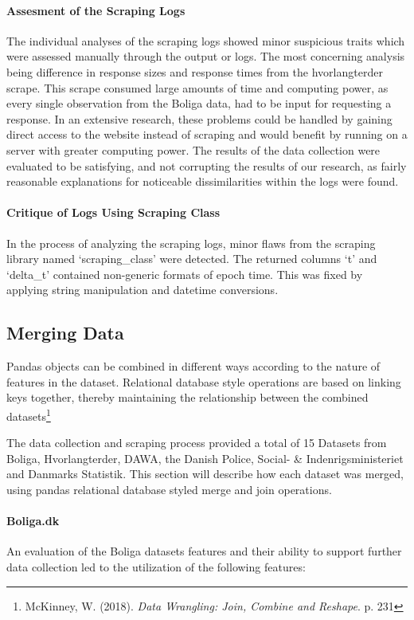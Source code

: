 \documentclass[12pt,a4paper]{article}
\begin{document}
\paragraph{Assesment of the Scraping Logs}
The individual analyses of the scraping logs showed minor suspicious traits which were assessed manually through the output or logs. The most concerning analysis being difference in response sizes and response times from the hvorlangterder scrape. This scrape consumed large amounts of time and computing power, as every single observation from the Boliga data, had to be input for requesting a response. In an extensive research, these problems could be handled by gaining direct access to the website instead of scraping and would benefit by running on a server with greater computing power. The results of the data collection were evaluated to be satisfying, and not corrupting the results of our research, as fairly reasonable explanations for noticeable dissimilarities within the logs were found. 

\paragraph{Critique of Logs Using Scraping Class}
In the process of analyzing the scraping logs, minor flaws from the scraping library named ‘scraping\_class’ were detected. The returned columns ‘t’ and ‘delta\_t’ contained non-generic formats of epoch time. This was fixed by applying string manipulation and datetime conversions. 

\subsection{Merging Data}
Pandas objects can be combined in different ways according to the nature of features in the dataset. Relational database style operations are based on linking keys together, thereby maintaining the relationship between the combined datasets\footnote{McKinney, W. (2018). \textit{Data Wrangling: Join, Combine and Reshape}. p. 231 }

The data collection and scraping process provided a total of 15 Datasets from Boliga, Hvorlangterder, DAWA, the Danish Police, Social- \& Indenrigsministeriet and Danmarks Statistik. This section will describe how each dataset was merged, using pandas relational database styled merge and join operations. 

\paragraph{Boliga.dk\newline}
An evaluation of the Boliga datasets features and their ability to support further data collection led to the utilization of the following features: 
\end{document}
